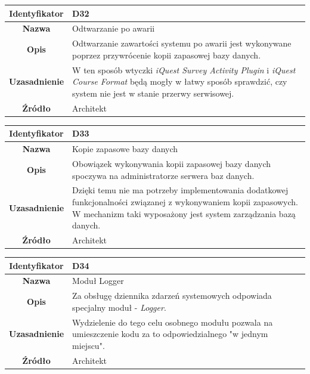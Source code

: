 \begin{table}[H]
\centering
\begin{tabular}{ | >{\bfseries}c | p{11cm} | }
\hline
%
Identyfikator & D32 \\ \hline
Nazwa & Odtwarzanie po awarii \\ \hline
Opis & Odtwarzanie zawartości systemu po awarii jest wykonywane poprzez przywrócenie kopii zapasowej bazy danych. \\ \hline
Uzasadnienie & W ten sposób wtyczki \textit{iQuest Survey Activity Plugin} i \textit{iQuest Course Format} będą mogły w łatwy sposób sprawdzić, czy system nie jest w stanie przerwy serwisowej. \\ \hline
Źródło & Architekt \\ \hline
%
\end{tabular}
\end{table}

\begin{table}[H]
\centering
\begin{tabular}{ | >{\bfseries}c | p{11cm} | }
\hline
%
Identyfikator & D33 \\ \hline
Nazwa & Kopie zapasowe bazy danych \\ \hline
Opis & Obowiązek wykonywania kopii zapasowej bazy danych spoczywa na administratorze serwera baz danych. \\ \hline
Uzasadnienie & Dzięki temu nie ma potrzeby implementowania dodatkowej funkcjonalności związanej z wykonywaniem kopii zapasowych. W mechanizm taki wyposażony jest system zarządzania bazą danych. \\ \hline
Źródło & Architekt \\ \hline
%
\end{tabular}
\end{table}

\begin{table}[H]
\centering
\begin{tabular}{ | >{\bfseries}c | p{11cm} | }
\hline
%
Identyfikator & D34 \\ \hline
Nazwa & Moduł Logger \\ \hline
Opis & Za obsługę dziennika zdarzeń systemowych odpowiada specjalny moduł - \textit{Logger}. \\ \hline
Uzasadnienie & Wydzielenie do tego celu osobnego modułu pozwala na umieszczenie kodu za to odpowiedzialnego "w jednym miejscu". \\ \hline
Źródło & Architekt \\ \hline
%
\end{tabular}
\end{table}

